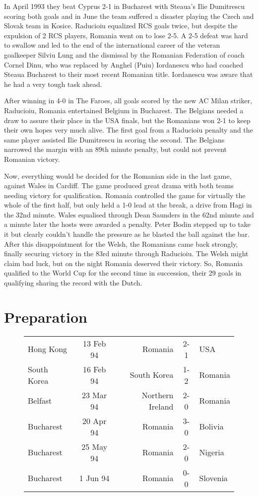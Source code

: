 In April 1993 they beat Cyprus 2-1 in Bucharest with Steaua's Ilie Dumitrescu 
scoring both goals and in June the team suffered a disaster playing the Czech
and Slovak team in Kosice. Raducioiu equalized RCS goals twice, but despite 
the expulsion of 2 RCS players, Romania went on to lose 2-5. A 2-5 defeat was 
hard to swallow and led to the end of the international career of the veteran 
goalkeeper Silviu Lung and the dismissal by the Romanian Federation of coach
Cornel Dinu, who was replaced by Anghel (Puiu) Iordanescu who had coached
Steaua Bucharest to their most recent Romanian title. Iordanescu was aware that
he had a very tough task ahead.

After winning in 4-0 in The Faroes, all goals scored by the new AC Milan 
striker, Raducioiu, Romania entertained Belgium in Bucharest. The Belgians 
needed a draw to assure their place in the USA finals, but the Romanians won 
2-1 to keep their own hopes very much alive. The first goal from a Raducioiu
penalty and the same player assisted Ilie Dumitrescu in scoring the second. 
The Belgians narrowed the margin with an 89th minute penalty, but could not 
prevent Romanian victory.

Now, everything would be decided for the Romanian side in the last game, 
against Wales in Cardiff. The game produced great drama with both teams needing
victory for qualification. Romania controlled the game for virtually the whole
of the first half, but only held a 1-0 lead at the break, a drive from Hagi in
the 32nd minute. Wales equalised through Dean Saunders in the 62nd minute and a
minute later the hosts were awarded a penalty. Peter Bodin stepped up to take 
it but clearly couldn't handle the pressure as he blasted the ball against the
bar. After this disappointment for the Welsh, the Romanians came back strongly,
finally securing victory in the 83rd minute through Raducioiu. The Welsh might
claim bad luck, but on the night Romania deserved their victory. So, Romania 
qualified to the World Cup for the second time in succession, their 29 goals
in qualifying sharing the record with the Dutch.

\section{Preparation}
\begin{figure}[H]
\begin{tabular}{l c r c l}
Hong Kong &13 Feb 94 &  Romania &  2-1  & USA \\
South Korea & 16 Feb 94 &  South Korea & 1-2 & Romania \\
Belfast & 23 Mar 94 &  Northern Ireland & 2-0 & Romania \\
Bucharest & 20 Apr 94 & Romania & 3-0 & Bolivia \\
Bucharest & 25 May 94 &  Romania &  2-0 & Nigeria \\
Bucharest & 1 Jun 94 &  Romania &  0-0 & Slovenia \\
\end{tabular}
\end{figure}

